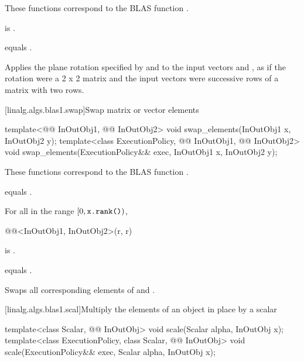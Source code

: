 \begin{itemdescr}
\pnum
\begin{note}
These functions correspond to the BLAS function \supercite{blas1}.
\end{note}

\pnum
\mandates
{} is .

\pnum
\expects
{} equals .

\pnum
\effects
Applies the plane rotation
specified by  and  to
the input vectors  and ,
as if the rotation were a 2 x 2 matrix and
the input vectors were successive rows of a matrix with two rows.
\end{itemdescr}

[linalg.algs.blas1.swap]{Swap matrix or vector elements}

%
\begin{itemdecl}
template<@@ InOutObj1, @@ InOutObj2>
  void swap_elements(InOutObj1 x, InOutObj2 y);
template<class ExecutionPolicy, @@ InOutObj1, @@ InOutObj2>
  void swap_elements(ExecutionPolicy&& exec, InOutObj1 x, InOutObj2 y);
\end{itemdecl}

\begin{itemdescr}
\pnum
\begin{note}
These functions correspond to the BLAS function \supercite{blas1}.
\end{note}

\pnum
\constraints
{} equals .

\pnum
\mandates
For all  in the range $[0, \texttt{\protect x.rank()})$,
\begin{codeblock}
@@<InOutObj1, InOutObj2>(r, r)
\end{codeblock}
is .

\pnum
\expects
{} equals .

\pnum
\effects
Swaps all corresponding elements of  and .
\end{itemdescr}

[linalg.algs.blas1.scal]{Multiply the elements of an object in place by a scalar}

%
\begin{itemdecl}
template<class Scalar, @@ InOutObj>
  void scale(Scalar alpha, InOutObj x);
template<class ExecutionPolicy, class Scalar, @@ InOutObj>
  void scale(ExecutionPolicy&& exec, Scalar alpha, InOutObj x);
\end{itemdecl}

